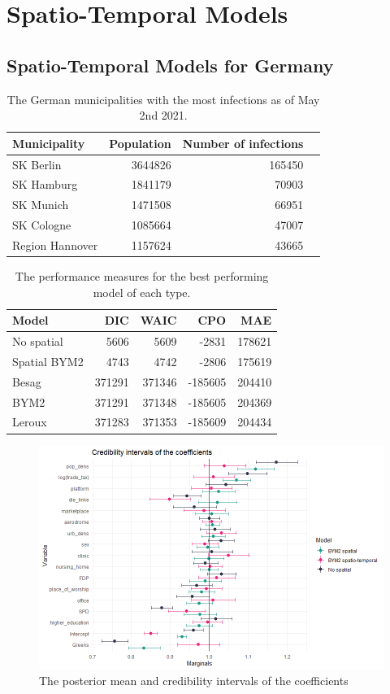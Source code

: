 \clearpage
\section{Spatio-Temporal Models}
\subsection{Spatio-Temporal Models for Germany}
\begin{table}[H] 
\caption{The German municipalities with the most infections as of May 2nd 2021. \label{top5Germany_temporal}}
\begin{tabular}{l r r r}
\toprule
\textbf{Municipality}	& \textbf{Population}	& \textbf{Number of infections} \\
\midrule
SK Berlin & 3644826 & 165450 \\
SK Hamburg & 1841179 & 70903 \\
SK Munich & 1471508 & 66951 \\
SK Cologne & 1085664 & 47007 \\
Region Hannover & 1157624 & 43665 \\
\bottomrule
\end{tabular}
\end{table}
\begin{table}[H] 
\caption{The performance measures for the best performing model of each type. \label{allGermany_temporal}}
\begin{tabular}{l r r r r}
\toprule
\textbf{Model}	& \textbf{DIC}	& \textbf{WAIC} & \textbf{CPO} & \textbf{MAE} \\
\midrule
No spatial & 5606 & 5609 & -2831 & 178621 \\
Spatial BYM2 & 4743 & 4742 & -2806 & 175619\\
Besag & 371291 & 371346 & -185605 & 204410 \\
BYM2 & 371291 & 371348 & -185605 & 204369\\
Leroux & 371283 & 371353 & -185609 & 204434\\
\bottomrule
\end{tabular}
\end{table}
\begin{figure}[H]
  \centering
  \includegraphics[width = \textwidth]{intervals_germany_temporal.png}
  \caption{The posterior mean and credibility intervals of the coefficients}
  \label{intervalGermany_temporal}
\end{figure}
